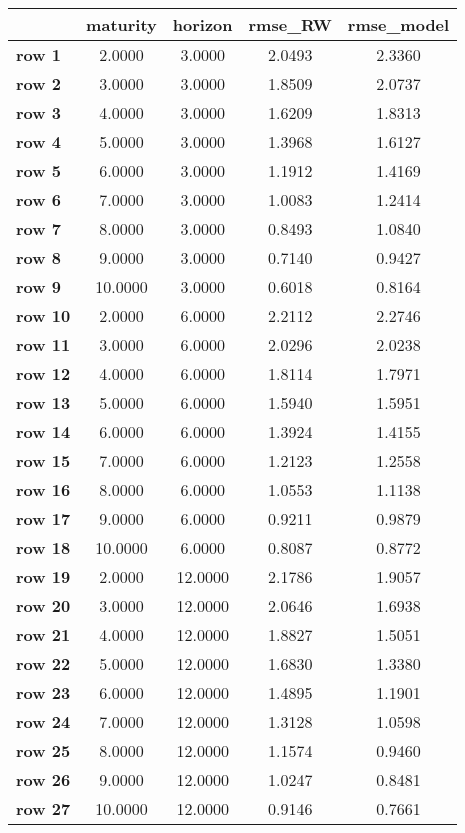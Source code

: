 \begin{tiny}\begin{tabular}{|l|c|c|c|c|}
\hline
&\textbf{maturity}&\textbf{horizon}&\textbf{rmse_RW}&\textbf{rmse_model}\\\hline
\textbf{row 1}&2.0000&3.0000&2.0493&2.3360\\\hline
\textbf{row 2}&3.0000&3.0000&1.8509&2.0737\\\hline
\textbf{row 3}&4.0000&3.0000&1.6209&1.8313\\\hline
\textbf{row 4}&5.0000&3.0000&1.3968&1.6127\\\hline
\textbf{row 5}&6.0000&3.0000&1.1912&1.4169\\\hline
\textbf{row 6}&7.0000&3.0000&1.0083&1.2414\\\hline
\textbf{row 7}&8.0000&3.0000&0.8493&1.0840\\\hline
\textbf{row 8}&9.0000&3.0000&0.7140&0.9427\\\hline
\textbf{row 9}&10.0000&3.0000&0.6018&0.8164\\\hline
\textbf{row 10}&2.0000&6.0000&2.2112&2.2746\\\hline
\textbf{row 11}&3.0000&6.0000&2.0296&2.0238\\\hline
\textbf{row 12}&4.0000&6.0000&1.8114&1.7971\\\hline
\textbf{row 13}&5.0000&6.0000&1.5940&1.5951\\\hline
\textbf{row 14}&6.0000&6.0000&1.3924&1.4155\\\hline
\textbf{row 15}&7.0000&6.0000&1.2123&1.2558\\\hline
\textbf{row 16}&8.0000&6.0000&1.0553&1.1138\\\hline
\textbf{row 17}&9.0000&6.0000&0.9211&0.9879\\\hline
\textbf{row 18}&10.0000&6.0000&0.8087&0.8772\\\hline
\textbf{row 19}&2.0000&12.0000&2.1786&1.9057\\\hline
\textbf{row 20}&3.0000&12.0000&2.0646&1.6938\\\hline
\textbf{row 21}&4.0000&12.0000&1.8827&1.5051\\\hline
\textbf{row 22}&5.0000&12.0000&1.6830&1.3380\\\hline
\textbf{row 23}&6.0000&12.0000&1.4895&1.1901\\\hline
\textbf{row 24}&7.0000&12.0000&1.3128&1.0598\\\hline
\textbf{row 25}&8.0000&12.0000&1.1574&0.9460\\\hline
\textbf{row 26}&9.0000&12.0000&1.0247&0.8481\\\hline
\textbf{row 27}&10.0000&12.0000&0.9146&0.7661\\\hline
\end{tabular}
\end{tiny}